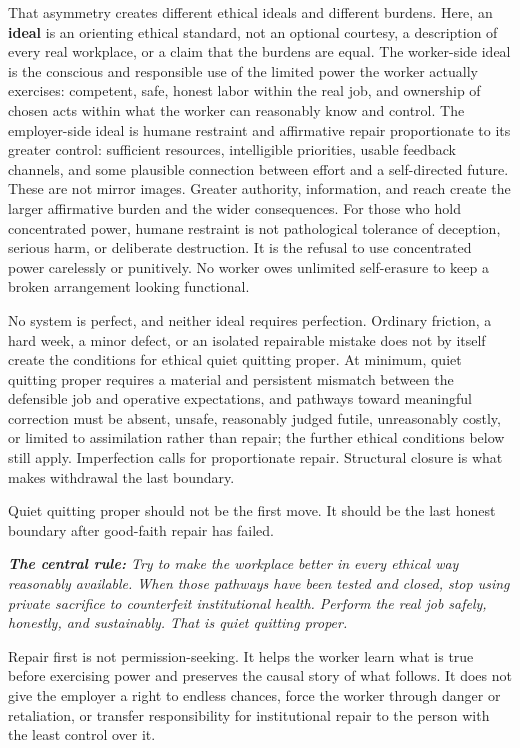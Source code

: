 \documentclass[11pt,oneside]{article}
\renewenvironment{quote}
  {\begin{tcolorbox}[
      enhanced,
      breakable,
      colback=ManifestLight,
      colframe=ManifestRule,
      boxrule=0pt,
      leftrule=3pt,
      arc=0pt,
      outer arc=0pt,
      left=10pt,right=10pt,top=8pt,bottom=8pt,
      before skip=0.8em,after skip=0.8em
    ]\itshape}
  {\end{tcolorbox}}
\begin{document}
That asymmetry creates different ethical ideals and different burdens.
Here, an \textbf{ideal} is an orienting ethical standard, not an
optional courtesy, a description of every real workplace, or a claim
that the burdens are equal. The worker-side ideal is the conscious and
responsible use of the limited power the worker actually exercises:
competent, safe, honest labor within the real job, and ownership of
chosen acts within what the worker can reasonably know and control. The
employer-side ideal is humane restraint and affirmative repair
proportionate to its greater control: sufficient resources, intelligible
priorities, usable feedback channels, and some plausible connection
between effort and a self-directed future. These are not mirror images.
Greater authority, information, and reach create the larger affirmative
burden and the wider consequences. For those who hold concentrated
power, humane restraint is not pathological tolerance of deception,
serious harm, or deliberate destruction. It is the refusal to use
concentrated power carelessly or punitively. No worker owes unlimited
self-erasure to keep a broken arrangement looking functional.

No system is perfect, and neither ideal requires perfection. Ordinary
friction, a hard week, a minor defect, or an isolated repairable mistake
does not by itself create the conditions for ethical quiet quitting
proper. At minimum, quiet quitting proper requires a material and
persistent mismatch between the defensible job and operative
expectations, and pathways toward meaningful correction must be absent,
unsafe, reasonably judged futile, unreasonably costly, or limited to
assimilation rather than repair; the further ethical conditions below
still apply. Imperfection calls for proportionate repair. Structural
closure is what makes withdrawal the last boundary.

Quiet quitting proper should not be the first move. It should be the
last honest boundary after good-faith repair has failed.

\begin{quote}
\textbf{The central rule:} Try to make the workplace better in every
ethical way reasonably available. When those pathways have been tested
and closed, stop using private sacrifice to counterfeit institutional
health. Perform the real job safely, honestly, and sustainably. That is
quiet quitting proper.
\end{quote}

Repair first is not permission-seeking. It helps the worker learn what
is true before exercising power and preserves the causal story of what
follows. It does not give the employer a right to endless chances, force
the worker through danger or retaliation, or transfer responsibility for
institutional repair to the person with the least control over it.
\end{document}
